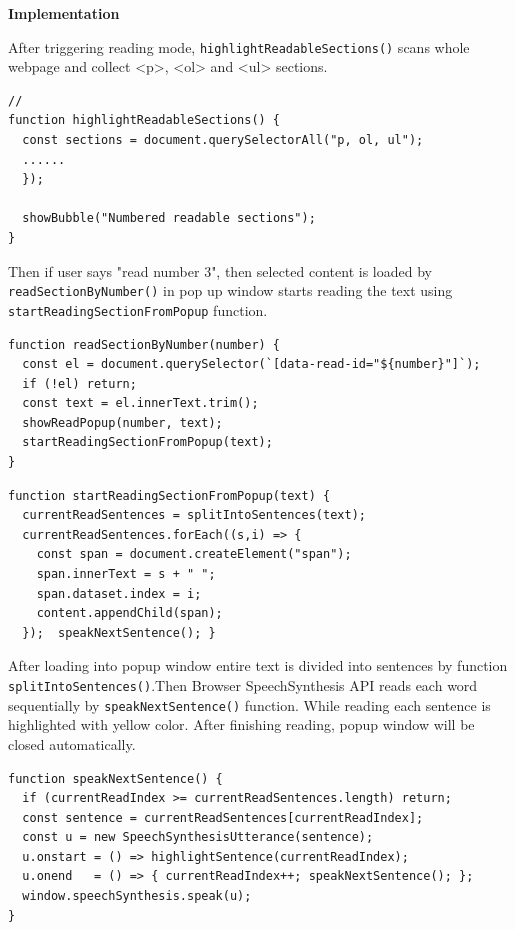 \textbf{Implementation}

After triggering reading mode, \texttt{highlightReadableSections()} scans whole webpage and collect <p>, <ol> and <ul> sections.
\begin{verbatim}
//
function highlightReadableSections() {
  const sections = document.querySelectorAll("p, ol, ul");
  ......
  });

  showBubble("Numbered readable sections");
}
\end{verbatim}

Then if user says "read number 3", then selected content is loaded by \texttt{readSectionByNumber()} 
 in pop up window starts reading the text using \texttt{startReadingSectionFromPopup} function.

\begin{verbatim}
function readSectionByNumber(number) {
  const el = document.querySelector(`[data-read-id="${number}"]`);
  if (!el) return;
  const text = el.innerText.trim();
  showReadPopup(number, text); 
  startReadingSectionFromPopup(text); 
}
\end{verbatim}

\vspace{1in}

\begin{verbatim}
function startReadingSectionFromPopup(text) {
  currentReadSentences = splitIntoSentences(text);
  currentReadSentences.forEach((s,i) => {
    const span = document.createElement("span");
    span.innerText = s + " ";
    span.dataset.index = i;
    content.appendChild(span);
  });  speakNextSentence(); }
\end{verbatim}


 After loading into popup window entire text is divided into sentences by function \texttt{splitIntoSentences()}.Then Browser SpeechSynthesis API reads each word sequentially by \texttt{speakNextSentence()} function. While reading each sentence is highlighted with yellow color. After finishing reading, popup window will be closed automatically.

 
\begin{verbatim}
function speakNextSentence() {
  if (currentReadIndex >= currentReadSentences.length) return;
  const sentence = currentReadSentences[currentReadIndex];
  const u = new SpeechSynthesisUtterance(sentence);
  u.onstart = () => highlightSentence(currentReadIndex);
  u.onend   = () => { currentReadIndex++; speakNextSentence(); };
  window.speechSynthesis.speak(u);
}
\end{verbatim}


